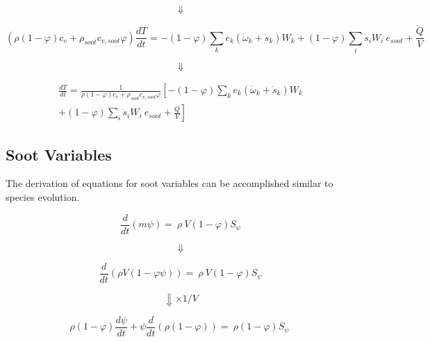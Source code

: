 \begin{equation*}
	\Downarrow
\end{equation*}

\begin{equation*}
	\left(\rho\left(1-\varphi\right)c_v+\rho_{soot}c_{v,soot}\varphi\right)
	\frac{dT}{dt}
	=
	-\left(1-\varphi\right)\sum_{k}{e_k\left({\dot{\omega}}_k+{\dot{s}}_k\right)W_k}+\left(1-\varphi\right)\sum_{i}{{\dot{s}}_iW_i}\ e_{soot}+\frac{\dot{Q}}{V}
\end{equation*}

\begin{equation*}
	\Downarrow
\end{equation*}

\begin{equation}
	\begin{split}
	\frac{dT}{dt}
	=
	\frac{1}{\rho\left(1-\varphi\right)c_v+\rho_{soot}c_{v,soot}\varphi}
	\left[
		-\left(1-\varphi\right)\sum_{k}{e_k\left({\dot{\omega}}_k+{\dot{s}}_k\right)W_k}
	\right.\\
	\left.
		+\left(1-\varphi\right)\sum_{i}{{\dot{s}}_iW_i}\ 	e_{soot}+\frac{\dot{Q}}{V}
	\right]
	\label{eqn:app_energyconstuv}
	\end{split}
\end{equation}

\subsection{Soot Variables}

The derivation of equations for soot variables can be accomplished similar to species evolution.

\begin{equation*}
	\frac{d}{dt}\left(m\psi\right)=\ \rho\ V(1-\varphi)S_{\psi}
\end{equation*}

\begin{equation*}
	\Downarrow
\end{equation*}

\begin{equation*}
	\frac{d}{dt}\left(\rho V(1-\varphi\psi)\right)=\ \rho\ V(1-\varphi)S_{\psi}
\end{equation*}

\begin{equation*}
	\Downarrow \times 1/V
\end{equation*}

\begin{equation*}
	\rho\left(1-\varphi\right)\frac{d\psi}{dt}
	+
	\psi\frac{d}{dt}\left(\rho(1-\varphi)\right)=\ \rho(1-\varphi)S_{\psi}\ 
\end{equation*}


